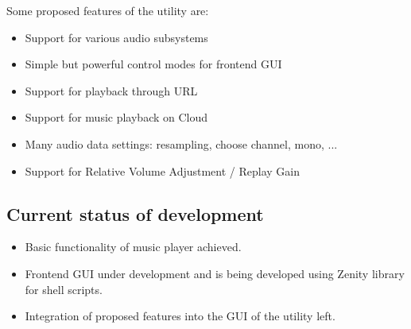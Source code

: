 \documentclass[paper=a4, fontsize=11pt]{scrartcl} %
\numberwithin{equation}{section} %
\numberwithin{figure}{section} %
\numberwithin{table}{section} %
\begin{document}
Some proposed features of the utility are:
\begin{itemize} \itemsep 1pt

	\item Support for various audio subsystems
	\item Simple but powerful control modes for frontend GUI
	\item Support for playback through URL
	\item Support for music playback on Cloud
	\item Many audio data settings: resampling, choose channel, mono, ...
	\item Support for Relative Volume Adjustment / Replay Gain

\end{itemize}


\subsection {Current status of development}
\begin{itemize} \itemsep -2pt

	\item Basic functionality of music player achieved.
	\item Frontend GUI under development and is being developed using Zenity library for shell scripts.
	\item Integration of proposed features into the GUI of the utility left.  

\end{itemize}






\end{document}
